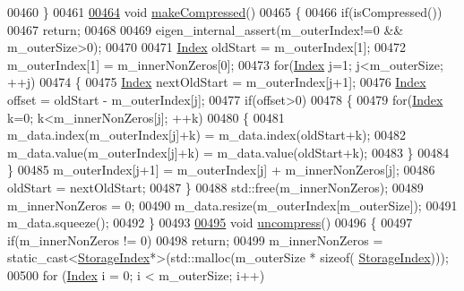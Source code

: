 \begin{DoxyCode}
00460     \}
00461 
\hyperlink{group___sparse_core___module_a5ff54ffc10296f9466dc81fa888733fd}{00464}     \textcolor{keywordtype}{void} \hyperlink{group___sparse_core___module_a5ff54ffc10296f9466dc81fa888733fd}{makeCompressed}()
00465     \{
00466       \textcolor{keywordflow}{if}(isCompressed())
00467         \textcolor{keywordflow}{return};
00468       
00469       eigen\_internal\_assert(m\_outerIndex!=0 && m\_outerSize>0);
00470       
00471       \hyperlink{group___core___module_a554f30542cc2316add4b1ea0a492ff02}{Index} oldStart = m\_outerIndex[1];
00472       m\_outerIndex[1] = m\_innerNonZeros[0];
00473       \textcolor{keywordflow}{for}(\hyperlink{group___core___module_a554f30542cc2316add4b1ea0a492ff02}{Index} j=1; j<m\_outerSize; ++j)
00474       \{
00475         \hyperlink{group___core___module_a554f30542cc2316add4b1ea0a492ff02}{Index} nextOldStart = m\_outerIndex[j+1];
00476         \hyperlink{group___core___module_a554f30542cc2316add4b1ea0a492ff02}{Index} offset = oldStart - m\_outerIndex[j];
00477         \textcolor{keywordflow}{if}(offset>0)
00478         \{
00479           \textcolor{keywordflow}{for}(\hyperlink{group___core___module_a554f30542cc2316add4b1ea0a492ff02}{Index} k=0; k<m\_innerNonZeros[j]; ++k)
00480           \{
00481             m\_data.index(m\_outerIndex[j]+k) = m\_data.index(oldStart+k);
00482             m\_data.value(m\_outerIndex[j]+k) = m\_data.value(oldStart+k);
00483           \}
00484         \}
00485         m\_outerIndex[j+1] = m\_outerIndex[j] + m\_innerNonZeros[j];
00486         oldStart = nextOldStart;
00487       \}
00488       std::free(m\_innerNonZeros);
00489       m\_innerNonZeros = 0;
00490       m\_data.resize(m\_outerIndex[m\_outerSize]);
00491       m\_data.squeeze();
00492     \}
00493 
\hyperlink{group___sparse_core___module_a7e560ebda035e992d2c99875cc7c3af3}{00495}     \textcolor{keywordtype}{void} \hyperlink{group___sparse_core___module_a7e560ebda035e992d2c99875cc7c3af3}{uncompress}()
00496     \{
00497       \textcolor{keywordflow}{if}(m\_innerNonZeros != 0)
00498         \textcolor{keywordflow}{return}; 
00499       m\_innerNonZeros = \textcolor{keyword}{static\_cast<}\hyperlink{group___sparse_core___module_a0b540ba724726ebe953f8c0df06081ed}{StorageIndex}*\textcolor{keyword}{>}(std::malloc(m\_outerSize * \textcolor{keyword}{sizeof}(
      \hyperlink{group___sparse_core___module_a0b540ba724726ebe953f8c0df06081ed}{StorageIndex})));
00500       \textcolor{keywordflow}{for} (\hyperlink{group___core___module_a554f30542cc2316add4b1ea0a492ff02}{Index} i = 0; i < m\_outerSize; i++)

\end{DoxyCode}
